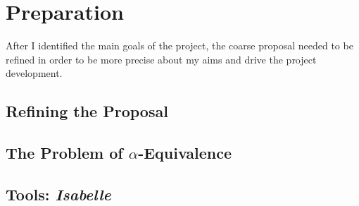 \chapter{Preparation}
After I identified the main goals of the project, the coarse proposal needed to be refined in order to be more precise about my aims and drive the project development.
\section{Refining the Proposal}
\section{The Problem of \(\alpha\)-Equivalence}
\section{Tools: \emph{Isabelle}}
